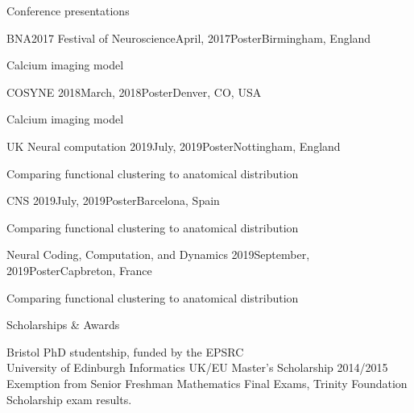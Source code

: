 \documentclass{resume} %
\begin{document}
\begin{rSection}{Conference presentations}
  \begin{rSubsection}{BNA2017 Festival of Neuroscience}{April, 2017}{Poster}{Birmingham, England}
    \item Calcium imaging model
  \end{rSubsection}

  \begin{rSubsection}{COSYNE 2018}{March, 2018}{Poster}{Denver, CO, USA}
    \item Calcium imaging model
  \end{rSubsection}

  \begin{rSubsection}{UK Neural computation 2019}{July, 2019}{Poster}{Nottingham, England}
    \item Comparing functional clustering to anatomical distribution
  \end{rSubsection}

  \begin{rSubsection}{CNS 2019}{July, 2019}{Poster}{Barcelona, Spain}
    \item Comparing functional clustering to anatomical distribution
  \end{rSubsection}

  \begin{rSubsection}{Neural Coding, Computation, and Dynamics 2019}{September, 2019}{Poster}{Capbreton, France}
    \item Comparing functional clustering to anatomical distribution
  \end{rSubsection}
\end{rSection}


\begin{rSection}{Scholarships \& Awards}

Bristol PhD studentship, funded by the EPSRC \\
University of Edinburgh Informatics UK/EU Master's Scholarship 2014/2015 \\
Exemption from Senior Freshman Mathematics Final Exams, Trinity Foundation Scholarship exam results.

\end{rSection}

\end{document}
